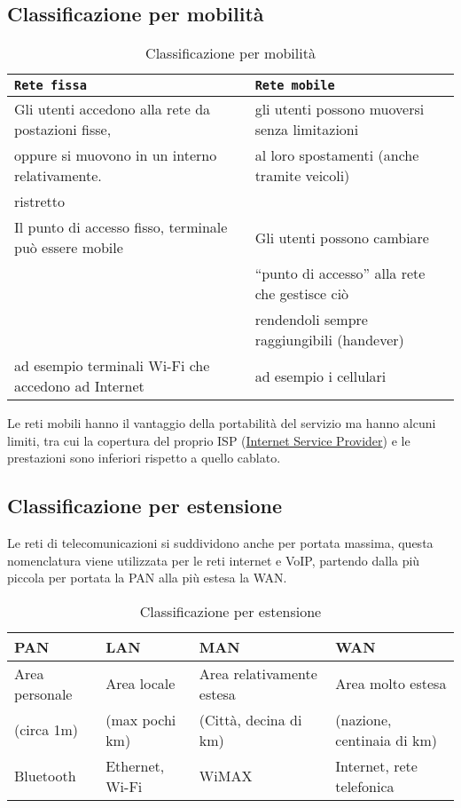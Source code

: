 \subsection{Classificazione per mobilità}
\label{sec:classificazionemobile}
\begin{table}[ht]
  \centering
  \begin{tabular}{ll}
    \texttt{Rete fissa} & \texttt{Rete mobile}\\\hline
    Gli utenti accedono alla rete da postazioni fisse, & gli utenti possono muoversi senza limitazioni\\
    oppure si muovono in un interno relativamente.  & al loro spostamenti (anche tramite veicoli) \\
    ristretto &\\\hline
    Il punto di accesso fisso, terminale può essere mobile & Gli utenti possono cambiare\\
                        & ``punto di accesso'' alla rete che gestisce ciò\\
                        &  rendendoli sempre raggiungibili (handever)\\\hline
    ad esempio terminali Wi-Fi che accedono ad Internet & ad esempio i cellulari\\\hline
  \end{tabular}
  \caption{Classificazione per mobilità}
  \label{tab:classipermobile}
\end{table}
\begin{nota}
  Le reti mobili hanno il vantaggio della portabilità del servizio ma hanno alcuni
  limiti, tra cui la copertura del proprio ISP (\underline{Internet Service Provider})
  e le prestazioni sono inferiori rispetto a quello cablato.
\end{nota}

\subsection{Classificazione per estensione}
\label{sec:classest}
Le reti di telecomunicazioni si suddividono anche per portata massima, questa
nomenclatura viene utilizzata per le reti internet e VoIP, partendo dalla più
piccola per portata la PAN alla più estesa la WAN. 
\begin{table}[ht]
  \centering
  \begin{tabular}{llll}
    PAN& LAN& MAN & WAN\\\hline
    Area personale & Area locale & Area relativamente estesa & Area molto estesa\\
    (circa 1m) & (max pochi km) & (Città, decina di km) & (nazione, centinaia di km)\\
    \hline
    Bluetooth & Ethernet, Wi-Fi & WiMAX & Internet, rete telefonica\\\hline
  \end{tabular}
  \caption{Classificazione per estensione}
  \label{tab:classest}
\end{table}

